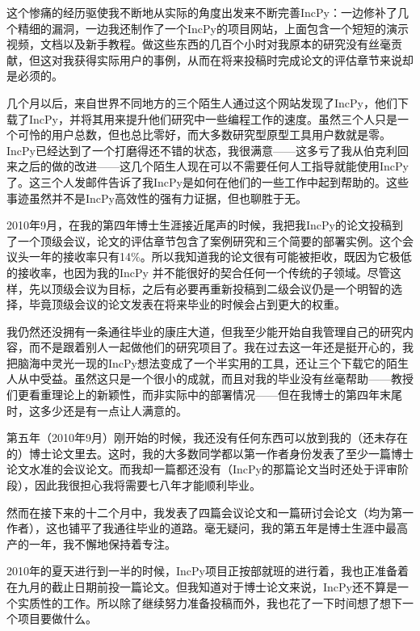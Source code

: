 \documentclass[letter,12pt]{book}
\begin{document}
\begin{CJK}{UTF8}{gbsn}
\breakline

这个惨痛的经历驱使我不断地从实际的角度出发来不断完善IncPy：一边修补了几个精细的漏洞，一边我还制作了一个IncPy的项目网站，上面包含一个短短的演示视频，文档以及新手教程。做这些东西的几百个小时对我原本的研究没有丝毫贡献，但这对我获得实际用户的事例，从而在将来投稿时完成论文的评估章节来说却是必须的。

几个月以后，来自世界不同地方的三个陌生人通过这个网站发现了IncPy，他们下载了IncPy，并将其用来提升他们研究中一些编程工作的速度。虽然三个人只是一个可怜的用户总数，但也总比零好，而大多数研究型原型工具用户数就是零。IncPy已经达到了一个打磨得还不错的状态，我很满意——这多亏了我从伯克利回来之后的做的改进——这几个陌生人现在可以不需要任何人工指导就能使用IncPy了。这三个人发邮件告诉了我IncPy是如何在他们的一些工作中起到帮助的。这些事迹虽然并不是IncPy高效性的强有力证据，但也聊胜于无。

2010年9月，在我的第四年博士生涯接近尾声的时候，我把我IncPy的论文投稿到了一个顶级会议，论文的评估章节包含了案例研究和三个简要的部署实例。这个会议头一年的接收率只有14\%。所以我知道我的论文很有可能被拒收，既因为它极低的接收率，也因为我的IncPy 并不能很好的契合任何一个传统的子领域。尽管这样，先以顶级会议为目标，之后有必要再重新投稿到二级会议仍是一个明智的选择，毕竟顶级会议的论文发表在将来毕业的时候会占到更大的权重。

我仍然还没拥有一条通往毕业的康庄大道，但我至少能开始自我管理自己的研究内容，而不是跟着别人一起做他们的研究项目了。我在过去这一年还是挺开心的，我把脑海中灵光一现的IncPy想法变成了一个半实用的工具，还让三个下载它的陌生人从中受益。虽然这只是一个很小的成就，而且对我的毕业没有丝毫帮助——教授们更看重理论上的新颖性，而非实际中的部署情况——但在我博士的第四年末尾时，这多少还是有一点让人满意的。

第五年（2010年9月）刚开始的时候，我还没有任何东西可以放到我的（还未存在的）博士论文里去。这时，我的大多数同学都以第一作者身份发表了至少一篇博士论文水准的会议论文。而我却一篇都还没有（IncPy的那篇论文当时还处于评审阶段），因此我很担心我将需要七八年才能顺利毕业。

然而在接下来的十二个月中，我发表了四篇会议论文和一篇研讨会论文（均为第一作者），这也铺平了我通往毕业的道路。毫无疑问，我的第五年是博士生涯中最高产的一年，我不懈地保持着专注。

\breakline

2010年的夏天进行到一半的时候，IncPy项目正按部就班的进行着，我也正准备着在九月的截止日期前投一篇论文。但我知道对于博士论文来说，IncPy还不算是一个实质性的工作。所以除了继续努力准备投稿而外，我也花了一下时间想了想下一个项目要做什么。


\end{CJK}
\end{document}
